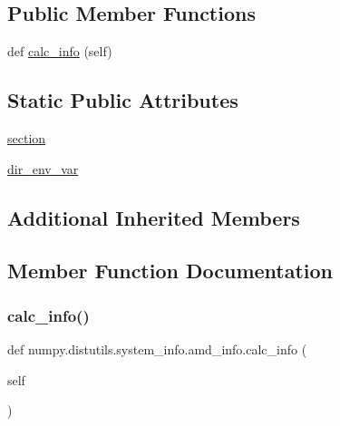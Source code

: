 \subsection*{Public Member Functions}
\begin{DoxyCompactItemize}
\item 
def \hyperlink{classnumpy_1_1distutils_1_1system__info_1_1amd__info_a746f31fb00943fb8970636010bfec9a2}{calc\+\_\+info} (self)
\end{DoxyCompactItemize}
\subsection*{Static Public Attributes}
\begin{DoxyCompactItemize}
\item 
\hyperlink{classnumpy_1_1distutils_1_1system__info_1_1amd__info_a3c0713088262a98359264db60022a331}{section}
\item 
\hyperlink{classnumpy_1_1distutils_1_1system__info_1_1amd__info_a69915b56e8300335c2c1cc97c1b8b3e0}{dir\+\_\+env\+\_\+var}
\end{DoxyCompactItemize}
\subsection*{Additional Inherited Members}


\subsection{Member Function Documentation}
\mbox{\label{classnumpy_1_1distutils_1_1system__info_1_1amd__info_a746f31fb00943fb8970636010bfec9a2}} 
\subsubsection{\texorpdfstring{calc\+\_\+info()}{calc\_info()}}
{\footnotesize\ttfamily def numpy.\+distutils.\+system\+\_\+info.\+amd\+\_\+info.\+calc\+\_\+info (\begin{DoxyParamCaption}\item[{}]{self }\end{DoxyParamCaption})}



